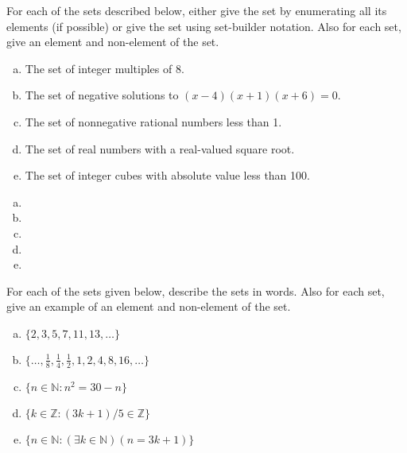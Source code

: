 \documentclass[11pt,letterpaper]{article}
\begin{document}

 For each of the sets described below, either give the set by enumerating all its elements (if possible) or give the set using set-builder notation. Also for each set, give an element and non-element of the set. 
	\begin{enumerate}[(a)]
	\item The set of integer multiples of 8. 
	\item The set of negative solutions to $(x - 4)(x + 1)(x + 6)= 0$.
	\item The set of nonnegative rational numbers less than 1. 
	\item The set of real numbers with a real-valued square root. 
	\item The set of integer cubes with absolute value less than 100.
	\end{enumerate} \pspace

\sol
\begin{enumerate}[(a)]
\item 
\item 
\item 
\item 
\item 
\end{enumerate}



\newpage



 For each of the sets given below, describe the sets in words. Also for each set, give an example of an element and non-element of the set.
	\begin{enumerate}[(a)]
	\item $\{ 2, 3, 5, 7, 11, 13, \ldots \}$
	\item $\{ \ldots, \frac{1}{8}, \frac{1}{4}, \frac{1}{2}, 1, 2, 4, 8, 16, \ldots \}$
	\item $\{ n \in \mathbb{N} \colon n^2= 30 - n \}$
	\item $\{ k \in \mathbb{Z} \colon (3k + 1)/5 \in \mathbb{Z} \}$
	\item $\{ n \in \mathbb{N} \colon (\exists k \in \mathbb{N})(n= 3k + 1) \}$
	\end{enumerate} \pspace
\end{document}
